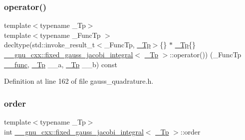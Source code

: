 \mbox{\label{struct____gnu__cxx_1_1fixed__gauss__jacobi__integral_ad20389e68e1c98098f892b118e614498}} 
\subsubsection{\texorpdfstring{operator()}{operator()}}
{\footnotesize\ttfamily template$<$typename \+\_\+\+Tp$>$ \\
template$<$typename \+\_\+\+Func\+Tp $>$ \\
decltype(std\+::invoke\+\_\+result\+\_\+t$<$\+\_\+\+Func\+Tp, \hyperlink{namespace____gnu__cxx_a3b19a9c800ca194374ef9172290f7d79}{\+\_\+\+Tp}$>$\{\} $\ast$ \hyperlink{namespace____gnu__cxx_a3b19a9c800ca194374ef9172290f7d79}{\+\_\+\+Tp}\{\} \hyperlink{struct____gnu__cxx_1_1fixed__gauss__jacobi__integral}{\+\_\+\+\_\+gnu\+\_\+cxx\+::fixed\+\_\+gauss\+\_\+jacobi\+\_\+integral}$<$ \hyperlink{namespace____gnu__cxx_a3b19a9c800ca194374ef9172290f7d79}{\+\_\+\+Tp} $>$\+::operator()) (\+\_\+\+Func\+Tp \hyperlink{namespace____gnu__cxx_af2b2f0c7a2ae72b922b1afefae5a65b2}{\+\_\+\+\_\+func}, \hyperlink{namespace____gnu__cxx_a3b19a9c800ca194374ef9172290f7d79}{\+\_\+\+Tp} \+\_\+\+\_\+a, \hyperlink{namespace____gnu__cxx_a3b19a9c800ca194374ef9172290f7d79}{\+\_\+\+Tp} \+\_\+\+\_\+b) const}



Definition at line 162 of file gauss\+\_\+quadrature.\+h.

\mbox{\label{struct____gnu__cxx_1_1fixed__gauss__jacobi__integral_ae5f494962a95203a0f799f039e4b6b33}} 
\subsubsection{\texorpdfstring{order}{order}}
{\footnotesize\ttfamily template$<$typename \+\_\+\+Tp$>$ \\
int \hyperlink{struct____gnu__cxx_1_1fixed__gauss__jacobi__integral}{\+\_\+\+\_\+gnu\+\_\+cxx\+::fixed\+\_\+gauss\+\_\+jacobi\+\_\+integral}$<$ \hyperlink{namespace____gnu__cxx_a3b19a9c800ca194374ef9172290f7d79}{\+\_\+\+Tp} $>$\+::order}



